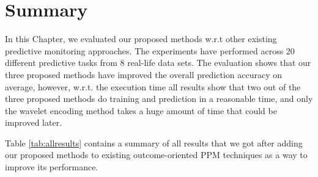 


\section{Summary}
In this Chapter, we evaluated our proposed methods w.r.t other existing predictive monitoring approaches. The experiments have performed across 20 different predictive tasks from 8 real-life data sets. The evaluation shows that our three proposed methods have improved the overall prediction accuracy on average,  however, w.r.t. the execution time all results show that two out of the three proposed methods do training and prediction in a reasonable time, and only the wavelet encoding method takes a huge amount of time that could be improved later. 



Table \ref{tab:allresults} contains a summary of all results that we got after adding our proposed methods to existing outcome-oriented PPM techniques as a way to improve its performance.


